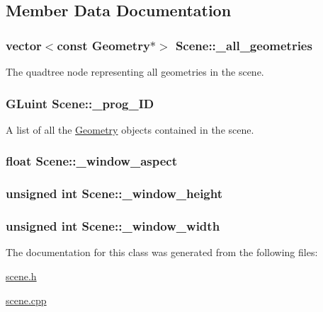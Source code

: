 \subsection{Member Data Documentation}
\hypertarget{class_scene_ae4e39aee440d748c4dc14a5aad13825d}{
\subsubsection[{\+\_\+all\+\_\+geometries}]{\setlength{\rightskip}{0pt plus 5cm}vector$<$const {\bf Geometry}$\ast$$>$ Scene\+::\+\_\+all\+\_\+geometries}}\label{class_scene_ae4e39aee440d748c4dc14a5aad13825d}


The quadtree node representing all geometries in the scene. 

\hypertarget{class_scene_a30e431c913372130cd9f97c0c1e3d75e}{
\subsubsection[{\+\_\+prog\+\_\+\+I\+D}]{\setlength{\rightskip}{0pt plus 5cm}G\+Luint Scene\+::\+\_\+prog\+\_\+\+I\+D}}\label{class_scene_a30e431c913372130cd9f97c0c1e3d75e}


A list of all the \hyperlink{class_geometry}{Geometry} objects contained in the scene. 

\hypertarget{class_scene_aa5d5f322f50e6518e88501fa5481eca9}{
\subsubsection[{\+\_\+window\+\_\+aspect}]{\setlength{\rightskip}{0pt plus 5cm}float Scene\+::\+\_\+window\+\_\+aspect}}\label{class_scene_aa5d5f322f50e6518e88501fa5481eca9}
\hypertarget{class_scene_a4a9a7b4b69981efd9ffddfb7d4205806}{
\subsubsection[{\+\_\+window\+\_\+height}]{\setlength{\rightskip}{0pt plus 5cm}unsigned int Scene\+::\+\_\+window\+\_\+height}}\label{class_scene_a4a9a7b4b69981efd9ffddfb7d4205806}
\hypertarget{class_scene_a9857688fb9c3a52be5e6b7551d7e3af8}{
\subsubsection[{\+\_\+window\+\_\+width}]{\setlength{\rightskip}{0pt plus 5cm}unsigned int Scene\+::\+\_\+window\+\_\+width}}\label{class_scene_a9857688fb9c3a52be5e6b7551d7e3af8}


The documentation for this class was generated from the following files\+:\begin{DoxyCompactItemize}
\item 
\hyperlink{scene_8h}{scene.\+h}\item 
\hyperlink{scene_8cpp}{scene.\+cpp}\end{DoxyCompactItemize}
